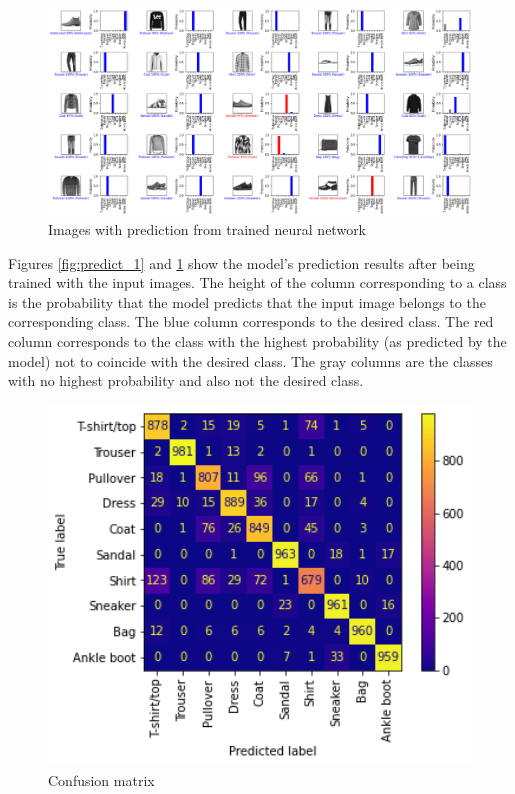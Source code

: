 \documentclass[14pt, a4paper]{article}
\numberwithin{equation}{section}
\numberwithin{algorithm}{section}
\numberwithin{figure}{section}
\begin{document}
\begin{figure}[h!]
  \centering
  \includegraphics[width=15cm]{images_with_predictions_2.png}
  \caption{Images with prediction from trained neural network}
  \label{fig:predict_2}
\end{figure}

Figures \ref{fig:predict_1} and \ref{fig:predict_2} show the model's prediction results after being trained with the input images. 
The height of the column corresponding to a class is the probability that the model predicts that the input image belongs to the corresponding class. The blue column corresponds to the desired class. The red column corresponds to the class with the highest probability (as predicted by the model) not to coincide with the desired class. 
The gray columns are the classes with no highest probability and also not the desired class.


\begin{figure}[h!]
  \centering
  \includegraphics[width=12cm]{confusion_matrix.png}
  \caption{Confusion matrix}
  \label{fig:confusion_matrix}
\end{figure}
\end{document}
